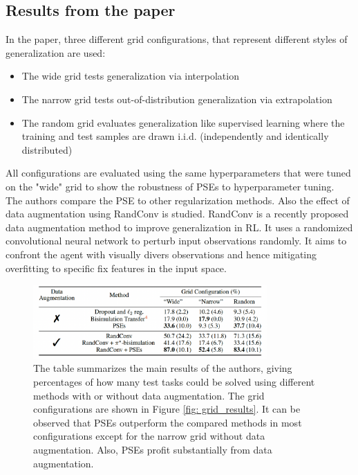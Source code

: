 \documentclass{usiinftr}
\begin{document}
\subsection{Results from the paper}
In the paper, three different grid configurations, that represent different styles of generalization are used:
\begin{itemize}
\item The wide grid tests generalization via interpolation
\item The narrow grid tests out-of-distribution generalization via extrapolation
\item The random grid evaluates generalization like supervised learning where the training and test samples are drawn i.i.d. (independently and identically distributed) 
\end{itemize}
All configurations are evaluated using the same hyperparameters that were tuned on the "wide" grid to show the robustness of PSEs to hyperparameter tuning. The authors compare the PSE to other regularization methods. 
Also the effect of data augmentation using RandConv is studied. RandConv is a recently proposed data augmentation method to improve generalization in RL. It uses a randomized convolutional neural network to perturb input observations randomly.
It aims to confront the agent with visually divers observations and hence mitigating overfitting to specific fix features in the input space. \cite{lee2020network}

\begin{figure}[h]
\centering
\includegraphics[width = 0.8\textwidth]{figures/tabular_results.png}
\caption{\label{fig: tabular_results}The table summarizes the main results of the authors, giving percentages of how many test tasks could be solved using different methods with or without data augmentation. The grid configurations are shown in Figure \ref{fig: grid_results}. It can be observed that PSEs outperform the compared methods in most configurations except for the narrow grid without data augmentation.
Also, PSEs profit substantially from data augmentation. \cite{agarwal2021contrastive}}
\end{figure}
\end{document}
